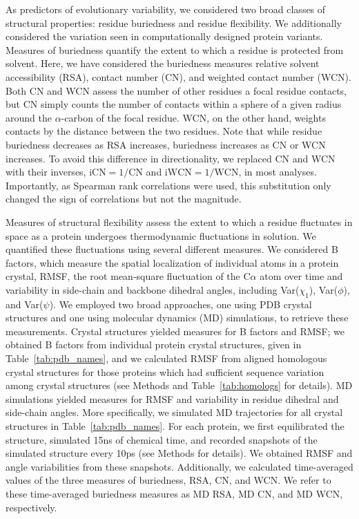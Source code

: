 \documentclass[smallextended]{svjour3}
\begin{document}
As predictors of evolutionary variability, we considered two broad classes of structural properties: residue buriedness and residue flexibility. We additionally considered the variation seen in computationally designed protein variants. Measures of buriedness quantify the extent to which a residue is protected from solvent. Here, we have considered the buriedness measures relative solvent accessibility (RSA), contact number (CN), and weighted contact number (WCN). Both CN and WCN assess the number of other residues a focal residue contacts, but CN simply counts the number of contacts within a sphere of a given radius around the $\alpha$-carbon of the focal residue. WCN, on the other hand, weights contacts by the distance between the two residues. Note that while residue buriedness decreases as RSA increases, buriedness increases as CN or WCN increases. To avoid this difference in directionality, we replaced CN and WCN with their inverses, $\text{iCN}=1/\text{CN}$ and $\text{iWCN}=1/\text{WCN}$, in most analyses. Importantly, as Spearman rank correlations were used, this substitution only changed the sign of correlations but not the magnitude.

Measures of structural flexibility assess the extent to which a residue fluctuates in space as a protein undergoes thermodynamic fluctuations in solution. We quantified these fluctuations using several different measures. We considered B factors, which measure the spatial localization of individual atoms in a protein crystal, RMSF, the root mean-square fluctuation of the C$\alpha$ atom over time and variability in side-chain and backbone dihedral angles, including Var($\chi_1$), Var($\phi$), and Var($\psi$). We employed two broad approaches, one using PDB crystal structures and one using molecular dynamics (MD) simulations, to retrieve these measurements. Crystal structures yielded measures for B factors and RMSF; we obtained B factors from individual protein crystal structures, given in Table~\ref{tab:pdb_names}, and we calculated RMSF from aligned homologous crystal structures for those proteins which had sufficient sequence variation among crystal structures (see Methods and Table~\ref{tab:homologs} for details). MD simulations yielded measures for RMSF and variability in residue dihedral and side-chain angles. More specifically, we simulated MD trajectories for all crystal structures in Table~\ref{tab:pdb_names}. For each protein, we first equilibrated the structure, simulated 15ns of chemical time, and recorded snapshots of the simulated structure every 10ps (see Methods for details). We obtained RMSF and angle variabilities from these snapshots. Additionally, we calculated time-averaged values of the three measures of buriedness, RSA, CN, and WCN. We refer to these time-averaged buriedness measures as MD RSA, MD CN, and MD WCN, respectively. 
\end{document}
